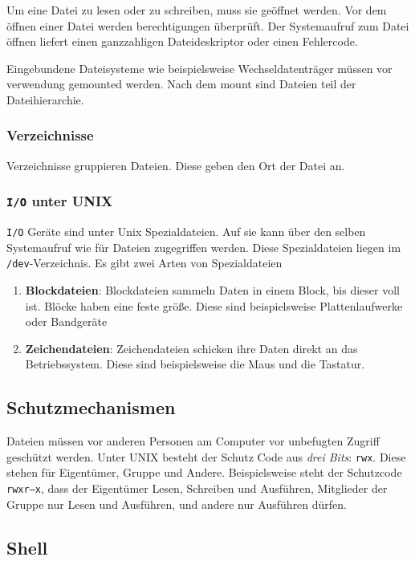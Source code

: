 Um eine Datei zu lesen oder zu schreiben, muss sie geöffnet werden. Vor dem öffnen einer Datei werden berechtigungen überprüft. Der Systemaufruf zum Datei öffnen liefert einen ganzzahligen Dateideskriptor oder einen Fehlercode. 

Eingebundene Dateisysteme wie beispielsweise Wechseldatenträger müssen vor verwendung gemounted werden. Nach dem mount sind Dateien teil der Dateihierarchie. 

\subsubsection{Verzeichnisse}

Verzeichnisse gruppieren Dateien. Diese geben den Ort der Datei an. 

\subsubsection{\texttt{I/O} unter UNIX}

\texttt{I/O} Geräte sind unter Unix Spezialdateien. Auf sie kann über den selben Systemaufruf wie für Dateien zugegriffen werden. Diese Spezialdateien liegen im \texttt{/dev}-Verzeichnis. Es gibt zwei Arten von Spezialdateien

\begin{enumerate}
    \item \textbf{Blockdateien}: Blockdateien sammeln Daten in einem Block, bis dieser voll ist. Blöcke haben eine feste größe. Diese sind beispielsweise Plattenlaufwerke oder Bandgeräte
    \item \textbf{Zeichendateien}: Zeichendateien schicken ihre Daten direkt an das Betriebssystem. Diese sind beispielsweise die Maus und die Tastatur.
\end{enumerate}

\subsection{Schutzmechanismen}

Dateien müssen vor anderen Personen am Computer vor unbefugten Zugriff geschützt werden. Unter UNIX besteht der Schutz Code aus \textit{drei Bits}: \texttt{rwx}. Diese stehen für Eigentümer, Gruppe und Andere. Beispielsweise steht der Schutzcode \texttt{rwxr--x}, dass der Eigentümer Lesen, Schreiben und Ausführen, Mitglieder der Gruppe nur Lesen und Ausführen, und andere nur Ausführen dürfen.

\subsection{Shell}

